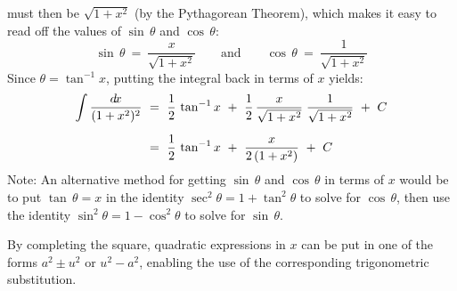 \begin{exmp}
must then be $\sqrt{1+x^2}$ (by the Pythagorean Theorem), which makes it easy to
read off the values of $\sin\,\theta$ and $\cos\,\theta$:
\[
\sin\,\theta ~=~ \frac{x}{\sqrt{1+x^2}}
\qquad\text{and}\qquad
\cos\,\theta ~=~ \frac{1}{\sqrt{1+x^2}}
\]
Since $\theta = \tan^{-1} x$, putting the integral back in terms of $x$ yields:
\begin{align*}
\int \frac{d\!x}{(1 + x^2)^2} ~&=~ \frac{1}{2}\,\tan^{-1} x ~+~
 \frac{1}{2}\,\frac{x}{\sqrt{1+x^2}}\;\frac{1}{\sqrt{1+x^2}} ~+~ C\\[6pt]
&=~ \frac{1}{2}\,\tan^{-1} x ~+~ \frac{x}{2\,(1 + x^2)} ~+~ C
\end{align*}
Note: An alternative method for getting $\sin\,\theta$ and $\cos\,\theta$ in
terms of $x$ would be to put $\tan\,\theta = x$ in the identity
$\sec^2 \theta = 1 + \tan^2 \theta$ to solve for $\cos\,\theta$, then use the
identity $\sin^2 \theta = 1 - \cos^2 \theta$ to solve for $\sin\,\theta$.
\end{exmp}
\divider
\vspace{2mm}
By completing the square, quadratic expressions in $x$ can be put in one of the
forms $a^2 \pm u^2$ or $u^2 - a^2$, enabling the use of the corresponding
trigonometric substitution.
\newpage
